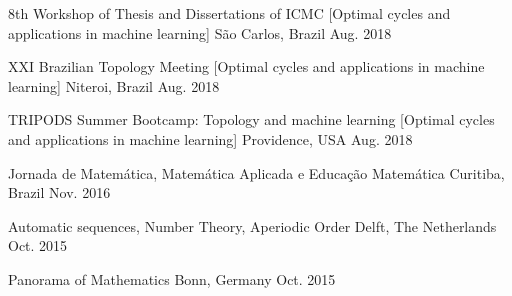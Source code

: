 \begin{cvhonors}
\cvhonor
  {8th Workshop of Thesis and Dissertations of ICMC} %
  [Optimal cycles and applications in machine learning] %
  {São Carlos, Brazil} %
  {Aug. 2018} %

\cvhonor
  {XXI Brazilian Topology Meeting} %
  [Optimal cycles and applications in machine learning] %
  {Niteroi, Brazil} %
  {Aug. 2018} %

\cvhonor
  {TRIPODS Summer Bootcamp: Topology and machine learning} %
  [Optimal cycles and applications in machine learning] %
  {Providence, USA} %
  {Aug. 2018} %

\cvhonor
  {Jornada de Matemática, Matemática Aplicada e Educação Matemática} %
  {Curitiba, Brazil} %
  {Nov. 2016} %

\cvhonor
  {Automatic sequences, Number Theory, Aperiodic Order} %
  {Delft, The Netherlands} %
  {Oct. 2015} %

\cvhonor
  {Panorama of Mathematics} %
  {Bonn, Germany} %
  {Oct. 2015} %

\end{cvhonors}
